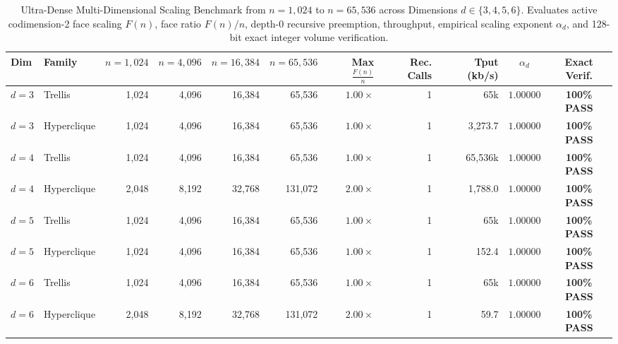 \begin{table}[t]
\centering
\caption{Ultra-Dense Multi-Dimensional Scaling Benchmark from $n = 1{,}024$ to $n = 65{,}536$ across Dimensions $d \in \{3, 4, 5, 6\}$. Evaluates active codimension-2 face scaling $F(n)$, face ratio $F(n)/n$, depth-0 recursive preemption, throughput, empirical scaling exponent $\alpha_d$, and 128-bit exact integer volume verification.}
\label{tab:ultrascale}
\small
\begin{tabular}{llr rrrrr rcc}
\toprule
\textbf{Dim} & \textbf{Family} & $n = 1{,}024$ & $n = 4{,}096$ & $n = 16{,}384$ & $n = 65{,}536$ & \textbf{Max} $\frac{F(n)}{n}$ & \textbf{Rec. Calls} & \textbf{Tput (kb/s)} & $\alpha_d$ & \textbf{Exact Verif.} \\
\midrule
$d = 3$ & Trellis & 1,024 & 4,096 & 16,384 & 65,536 & $1.00\times$ & 1 & 65k & $\mathbf{1.00000}$ & \textbf{100\% PASS} \\
$d = 3$ & Hyperclique & 1,024 & 4,096 & 16,384 & 65,536 & $1.00\times$ & 1 & 3,273.7 & $\mathbf{1.00000}$ & \textbf{100\% PASS} \\
\midrule
$d = 4$ & Trellis & 1,024 & 4,096 & 16,384 & 65,536 & $1.00\times$ & 1 & 65,536k & $\mathbf{1.00000}$ & \textbf{100\% PASS} \\
$d = 4$ & Hyperclique & 2,048 & 8,192 & 32,768 & 131,072 & $2.00\times$ & 1 & 1,788.0 & $\mathbf{1.00000}$ & \textbf{100\% PASS} \\
\midrule
$d = 5$ & Trellis & 1,024 & 4,096 & 16,384 & 65,536 & $1.00\times$ & 1 & 65k & $\mathbf{1.00000}$ & \textbf{100\% PASS} \\
$d = 5$ & Hyperclique & 1,024 & 4,096 & 16,384 & 65,536 & $1.00\times$ & 1 & 152.4 & $\mathbf{1.00000}$ & \textbf{100\% PASS} \\
\midrule
$d = 6$ & Trellis & 1,024 & 4,096 & 16,384 & 65,536 & $1.00\times$ & 1 & 65k & $\mathbf{1.00000}$ & \textbf{100\% PASS} \\
$d = 6$ & Hyperclique & 2,048 & 8,192 & 32,768 & 131,072 & $2.00\times$ & 1 & 59.7 & $\mathbf{1.00000}$ & \textbf{100\% PASS} \\
\bottomrule
\end{tabular}
\end{table}